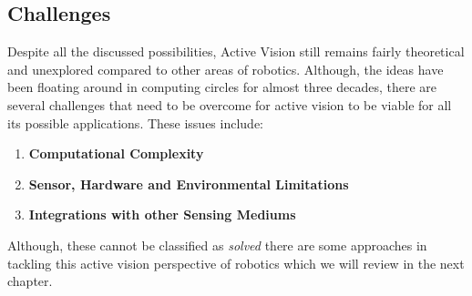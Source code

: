   \subsection{Challenges}
  Despite all the discussed possibilities, Active Vision still remains fairly theoretical and unexplored compared to other areas of robotics. Although, the ideas have been floating around in computing circles for almost three decades, there are several challenges that need to be overcome for active vision to be viable for all its possible applications. These issues include:
  \begin{enumerate}
    \item \textbf{Computational Complexity}
    \item \textbf{Sensor, Hardware and Environmental Limitations}
    \item \textbf{Integrations with other Sensing Mediums
    }
  \end{enumerate}

  Although, these cannot be classified as \emph{solved} there are some approaches in tackling this active vision perspective of robotics which we will review in the next chapter.